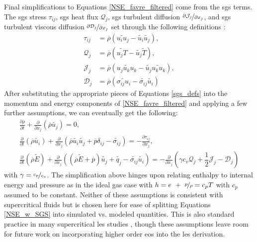 Final simplifications to Equations \eqref{NSE_favre_filtered} come from the \gls{sgs} terms. The \gls{sgs} stress $\tau_{ij}$, \gls{sgs} heat flux $\mathcal{Q}_j$, \gls{sgs} turbulent diffusion $\nicefrac{\partial \mathcal{J}_j}{\partial x_j}$, and \gls{sgs} turbulent viscous diffusion $\nicefrac{\partial \mathcal{D}_j}{\partial x_j}$ set through the following definitions \cite{LES_Comp}:
\begin{equation} \label{sgs_defs}
\begin{aligned}
\tau_{ij} &= \overline{\rho}\left(\widetilde{u_i u_j} - \widetilde{u_i}\widetilde{u_j} \right), \\
\mathcal{Q}_{j} &= \overline{\rho}\left(\widetilde{u_j T} - \widetilde{u_j}\widetilde{T} \right), \\
\mathcal{J}_{j} &= \overline{\rho}\left(\widetilde{u_j u_k u_k} - \widetilde{u_j}\widetilde{u_k u_k} \right), \\
\mathcal{D}_{j} &= \overline{\rho}\left(\widetilde{\sigma_{ij}u_i} - \widetilde{\sigma_{ij}}\widetilde{u_i} \right)
\end{aligned}
\end{equation} 
After substituting the appropriate pieces of Equations \eqref{sgs_defs} into the momentum and energy components of \eqref{NSE_favre_filtered} and applying a few further assumptions, we can eventually get the following:
\begin{subequations} \label{NSE_w_SGS}
\begin{align}
  \frac{\partial\overline{\rho}}{\partial t} + \frac{\partial }{\partial x_j} \left( \overline{\rho}\widetilde{ u_j} \right) = 0, \label{NSE_mass_sgs} \\
  \frac{\partial}{\partial t} \left( \overline{\rho}\widetilde{ u_i }\right) + \frac{\partial}{\partial x_j} \left(\overline{\rho}\widetilde{ u_i} \widetilde{u_j} + \overline{p }\delta_{ij} - \widetilde{\sigma_{ij}} \right) = - \frac{\partial \tau_{ij}}{\partial x_j}, \label{NSE_mom_sgs}  \\
  \frac{\partial}{\partial t} \left( \overline{\rho}\widetilde{ E} \right) + \frac{\partial}{\partial x_j} \left(\left( \overline{\rho}\widetilde{ E}+\overline{p} \right)\widetilde{u_j} + \widetilde{q_j} - \widetilde{\sigma_{ij}}\widetilde{ u_i}\right) = - \frac{\partial}{\partial x_j } \left( \gamma c_v \mathcal{Q}_j + \dfrac{1}{2} \mathcal{J}_j - \mathcal{D}_j \right)  \label{NSE_E_sgs}
\end{align}
\end{subequations}
with $\gamma = \nicefrac{c_p}{c_v}$. The simplification above hinges upon relating enthalpy to internal energy and pressure as in the ideal gas case with $h = e ~+~ \nicefrac{p}{\rho} = c_p T$ with $c_p$ assumed to be constant. Neither of these assumptions is consistent with supercritical fluids but is chosen here for ease of splitting Equations \eqref{NSE_w_SGS} into simulated vs. modeled quantities. This is also standard practice in many supercritical \gls{les} studies \cite{}, though these assumptions leave room for future work on incorporating higher order \gls{eos} into the \gls{les} derivation. 

